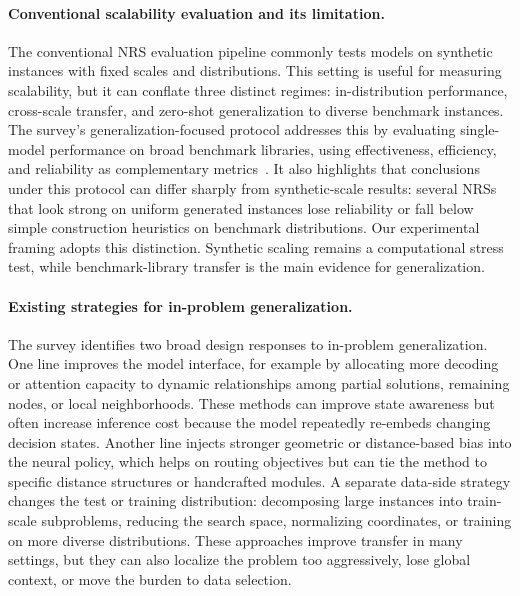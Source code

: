 \documentclass[11pt]{article}
\begin{document}
\paragraph{Conventional scalability evaluation and its limitation.}
The conventional NRS evaluation pipeline commonly tests models on synthetic instances with fixed scales and distributions.
This setting is useful for measuring scalability, but it can conflate three distinct regimes: in-distribution performance, cross-scale transfer, and zero-shot generalization to diverse benchmark instances.
The survey's generalization-focused protocol addresses this by evaluating single-model performance on broad benchmark libraries, using effectiveness, efficiency, and reliability as complementary metrics~\cite{nrs-survey}.
It also highlights that conclusions under this protocol can differ sharply from synthetic-scale results: several NRSs that look strong on uniform generated instances lose reliability or fall below simple construction heuristics on benchmark distributions.
Our experimental framing adopts this distinction.
Synthetic scaling remains a computational stress test, while benchmark-library transfer is the main evidence for generalization.

\paragraph{Existing strategies for in-problem generalization.}
The survey identifies two broad design responses to in-problem generalization.
One line improves the model interface, for example by allocating more decoding or attention capacity to dynamic relationships among partial solutions, remaining nodes, or local neighborhoods.
These methods can improve state awareness but often increase inference cost because the model repeatedly re-embeds changing decision states.
Another line injects stronger geometric or distance-based bias into the neural policy, which helps on routing objectives but can tie the method to specific distance structures or handcrafted modules.
A separate data-side strategy changes the test or training distribution: decomposing large instances into train-scale subproblems, reducing the search space, normalizing coordinates, or training on more diverse distributions.
These approaches improve transfer in many settings, but they can also localize the problem too aggressively, lose global context, or move the burden to data selection.
\end{document}
